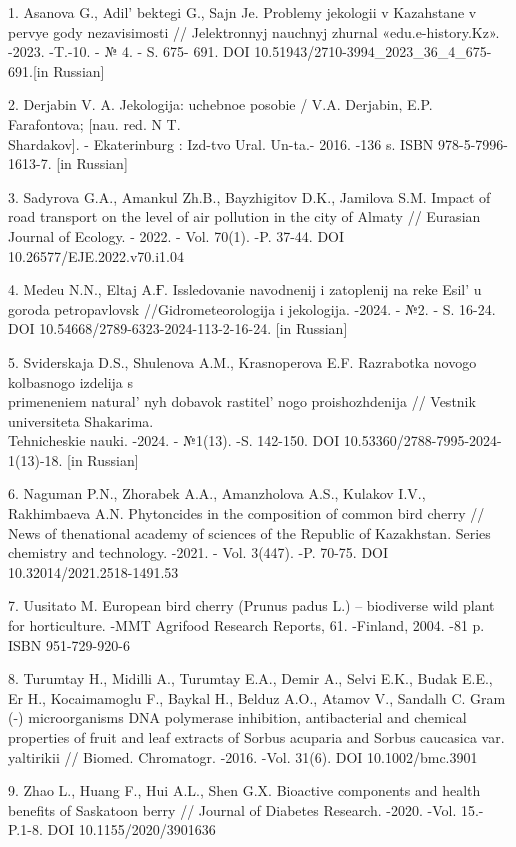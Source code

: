 \begin{references}
1. Asanova G., Adil' bektegi G., Sajn Je. Problemy
jekologii v Kazahstane v pervye gody nezavisimosti // Jelektronnyj
nauchnyj zhurnal «edu.e-history.Kz». -2023. -T.-10. - № 4. - S. 675-
691. DOI 10.51943/2710-3994\_2023\_36\_4\_675-691.{[}in Russian{]}

2. Derjabin V. A. Jekologija: uchebnoe posobie / V.A. Derjabin, E.P.
Farafontova; {[}nau. red. N T. \\Shardakov{]}. - Ekaterinburg : Izd-tvo
Ural. Un-ta.- 2016. -136 s. ISBN 978-5-7996-1613-7. {[}in Russian{]}

3. Sadyrova G.A., Amankul Zh.B., Bayzhigitov D.K., Jamilova S.M. Impact
of road transport on the level of air pollution in the city of Almaty //
Eurasian Journal of Ecology. - 2022. - Vol. 70(1). -P. 37-44. DOI
10.26577/EJE.2022.v70.i1.04

4. Medeu N.N., Eltaj A.Ғ. Issledovanie navodnenij i zatoplenij na reke
Esil'{} u goroda petropavlovsk //Gidrometeorologija i
jekologija. -2024. - №2. - S. 16-24. DOI
10.54668/2789-6323-2024-113-2-16-24. {[}in Russian{]}

5. Sviderskaja D.S., Shulenova A.M., Krasnoperova E.F. Razrabotka novogo
kolbasnogo izdelija s \\primeneniem natural' nyh dobavok
rastitel' nogo proishozhdenija // Vestnik universiteta
Shakarima. \\Tehnicheskie nauki. -2024. - №1(13). -S. 142-150.
DOI 10.53360/2788-7995-2024-1(13)-18. {[}in Russian{]}

6. Naguman P.N., Zhorabek A.A., Amanzholova A.S., Kulakov I.V.,
Rakhimbaeva A.N. Phytoncides in the composition of common bird cherry //
News of thenational academy of sciences of the Republic of Kazakhstan.
Series chemistry and technology. -2021. - Vol. 3(447). -P. 70-75. DOI
10.32014/2021.2518-1491.53

7. Uusitato M. European bird cherry (Prunus padus L.) -- biodiverse wild
plant for horticulture. -MMT Agrifood Research Reports, 61. -Finland,
2004. -81 p. ISBN 951-729-920-6

8. Turumtay H., Midilli A., Turumtay E.A., Demir A., Selvi E.K., Budak
E.E., Er H., Kocaimamoglu F., Baykal H., Belduz A.O., Atamov V.,
Sandallı C. Gram (-) microorganisms DNA polymerase inhibition,
antibacterial and chemical properties of fruit and leaf extracts of
Sorbus acuparia and Sorbus caucasica var. yaltirikii // Biomed.
Chromatogr. -2016. -Vol. 31(6). DOI 10.1002/bmc.3901

9. Zhao L., Huang F., Hui A.L., Shen G.X. Bioactive components and health
benefits of Saskatoon berry // Journal of Diabetes Research. -2020.
-Vol. 15.- P.1-8. DOI 10.1155/2020/3901636


\end{references}
